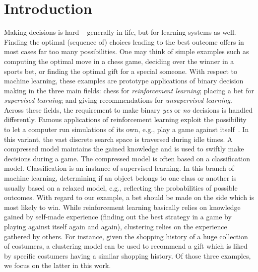 \chapter{Introduction}
Making decisions is hard -- generally in life, but for learning systems as well. Finding the optimal (sequence of) choices leading to the best outcome offers in most cases far too many possibilities. One may think of simple examples such as computing the optimal move in a chess game, deciding over the winner in a sports bet, or finding the optimal gift for a special someone. With respect to machine learning, these examples are prototype applications of binary decision making in the three main fields: chess for \emph{reinforcement learning}; placing a bet for \emph{supervised learning}; and giving recommendations for \emph{unsupervised learning}. Across these fields, the requirement to make binary \emph{yes} or \emph{no} decisions is handled differently. Famous applications of reinforcement learning exploit the possibility to let a computer run simulations of its own, e.g., play a game against itself~\citep{silver2017mastering}. In this variant, the vast discrete search space is traversed during idle times. A compressed model maintains the gained knowledge and is used to swiftly make decisions during a game. The compressed model is often based on a classification model. Classification is an instance of supervised learning. In this branch of machine learning, determining if an object belongs to one class or another is usually based on a relaxed model, e.g., reflecting the probabilities of possible outcomes. With regard to our example, a bet should be made on the side which is most likely to win.
While reinforcement learning basically relies on knowledge gained by self-made experience (finding out the best strategy in a game by playing against itself again and again), clustering relies on the experience gathered by others. For instance, given the shopping history of a huge collection of costumers, a clustering model can be used to recommend a gift which is liked by specific costumers having a similar shopping history. Of those three examples, we focus on the latter in this work.  

